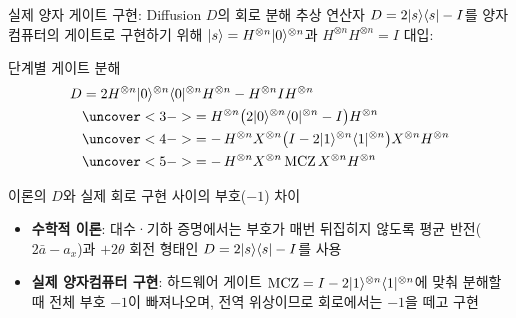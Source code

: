 \documentclass[aspectratio=169, 10pt]{beamer}
\begin{document}
\begin{frame}{실제 양자 게이트 구현: Diffusion $D$의 회로 분해}
    추상 연산자 $D = 2|s\rangle\langle s| - I$를 양자컴퓨터의 게이트로 구현하기 위해 $|s\rangle = H^{\otimes n}|0\rangle^{\otimes n}$과 $H^{\otimes n}H^{\otimes n} = I$ 대입:
    \pause
    \vspace{0.03cm}
    \begin{qcblock}{단계별 게이트 분해}
        {\small\vspace{-0.2cm}
        \begin{align*}
            D &= 2 H^{\otimes n}\ket{0}^{\otimes n}\bra{0}^{\otimes n}H^{\otimes n} - H^{\otimes n}IH^{\otimes n} \\
            &\uncover<3->{\displaystyle = H^{\otimes n}\big(2\ket{0}^{\otimes n}\bra{0}^{\otimes n} - I\big)H^{\otimes n}} \\
            &\uncover<4->{\displaystyle = -\,H^{\otimes n} X^{\otimes n}\big(I - 2\ket{1}^{\otimes n}\bra{1}^{\otimes n}\big)X^{\otimes n} H^{\otimes n}} \\
            &\uncover<5->{\displaystyle = -\,H^{\otimes n} X^{\otimes n}\,\mathrm{MCZ}\,X^{\otimes n} H^{\otimes n}}
        \end{align*}
        \vspace{-0.22cm}}
    \end{qcblock}
    \pause[6]
    \vspace{0.02cm}
    \begin{qctip}{이론의 $D$와 실제 회로 구현 사이의 부호($-1$) 차이}
        \begin{itemize}\setlength{\itemsep}{1pt}
            \item \textbf{수학적 이론}: 대수·기하 증명에서는 부호가 매번 뒤집히지 않도록 평균 반전($2\bar{a}-a_x$)과 $+2\theta$ 회전 형태인 $D = 2|s\rangle\langle s| - I$를 사용
            \pause
            \item \textbf{실제 양자컴퓨터 구현}: 하드웨어 게이트 $\mathrm{MCZ} = I - 2|1\rangle^{\otimes n}\langle1|^{\otimes n}$에 맞춰 분해할 때 전체 부호 $-1$이 빠져나오며, 전역 위상이므로 회로에서는 $-1$을 떼고 구현
        \end{itemize}
    \end{qctip}
\end{frame}
\end{document}
